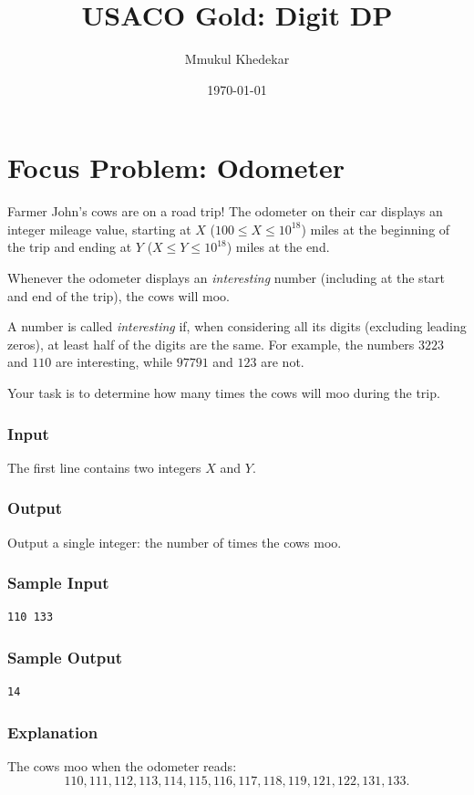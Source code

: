 \documentclass[11pt]{scrartcl}
\title{USACO Gold: Digit DP}
\author{Mmukul Khedekar}
\date{\today}
\begin{document}
\maketitle
\tableofcontents

\newpage
\section{Focus Problem: Odometer}

\begin{problem}[\href{https://usaco.org/index.php?page=viewproblem2&cpid=435}{USACO 2014 US Open (Silver) --- Problem 3, Odometer}]
Farmer John's cows are on a road trip! The odometer on their car displays
an integer mileage value, starting at $X$ ($100 \le X \le 10^{18}$) miles
at the beginning of the trip and ending at $Y$ ($X \le Y \le 10^{18}$)
miles at the end.

Whenever the odometer displays an \emph{interesting} number (including
at the start and end of the trip), the cows will moo.

A number is called \emph{interesting} if, when considering all its digits
(excluding leading zeros), at least half of the digits are the same.
For example, the numbers $3223$ and $110$ are interesting, while
$97791$ and $123$ are not.

Your task is to determine how many times the cows will moo during the
trip.

\subsubsection*{Input}
The first line contains two integers $X$ and $Y$.

\subsubsection*{Output}
Output a single integer: the number of times the cows moo.

\subsubsection*{Sample Input}
\begin{verbatim}
110 133
\end{verbatim}

\subsubsection*{Sample Output}
\begin{verbatim}
14
\end{verbatim}

\subsubsection*{Explanation}
The cows moo when the odometer reads:
\[
110, 111, 112, 113, 114, 115, 116, 117, 118, 119, 121, 122, 131, 133.
\]
\end{problem}
\end{document}

